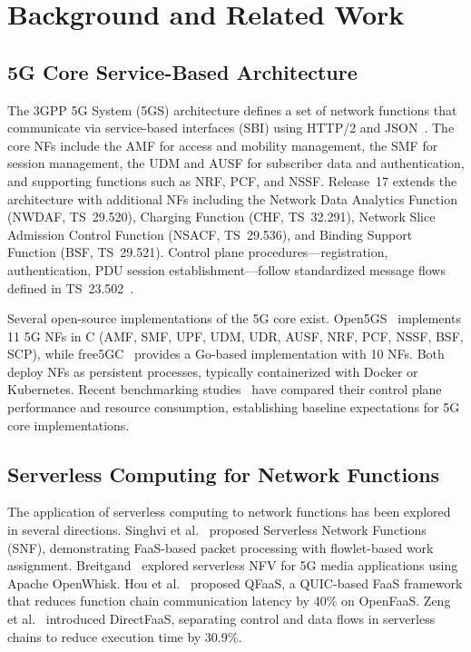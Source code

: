 \documentclass[conference]{IEEEtran}
\begin{document}
\section{Background and Related Work}
\label{sec:background}

\subsection{5G Core Service-Based Architecture}

The 3GPP 5G System (5GS) architecture defines a set of network functions that communicate via service-based interfaces (SBI) using HTTP/2 and JSON~\cite{3gpp-23501}. The core NFs include the AMF for access and mobility management, the SMF for session management, the UDM and AUSF for subscriber data and authentication, and supporting functions such as NRF, PCF, and NSSF. Release~17 extends the architecture with additional NFs including the Network Data Analytics Function (NWDAF, TS~29.520), Charging Function (CHF, TS~32.291), Network Slice Admission Control Function (NSACF, TS~29.536), and Binding Support Function (BSF, TS~29.521). Control plane procedures---registration, authentication, PDU session establishment---follow standardized message flows defined in TS~23.502~\cite{3gpp-23502}.

Several open-source implementations of the 5G core exist. Open5GS~\cite{open5gs} implements 11 5G NFs in C (AMF, SMF, UPF, UDM, UDR, AUSF, NRF, PCF, NSSF, BSF, SCP), while free5GC~\cite{free5gc} provides a Go-based implementation with 10 NFs. Both deploy NFs as persistent processes, typically containerized with Docker or Kubernetes. Recent benchmarking studies~\cite{oran-bench-2024, 5gc-bench-2023} have compared their control plane performance and resource consumption, establishing baseline expectations for 5G core implementations.

\subsection{Serverless Computing for Network Functions}

The application of serverless computing to network functions has been explored in several directions. Singhvi et al.~\cite{snf-2020} proposed Serverless Network Functions (SNF), demonstrating FaaS-based packet processing with flowlet-based work assignment. Breitgand~\cite{5gmedia-2018} explored serverless NFV for 5G media applications using Apache OpenWhisk. Hou et al.~\cite{qfaas-2022} proposed QFaaS, a QUIC-based FaaS framework that reduces function chain communication latency by 40\% on OpenFaaS. Zeng et al.~\cite{directfaas-2024} introduced DirectFaaS, separating control and data flows in serverless chains to reduce execution time by 30.9\%.
\end{document}
